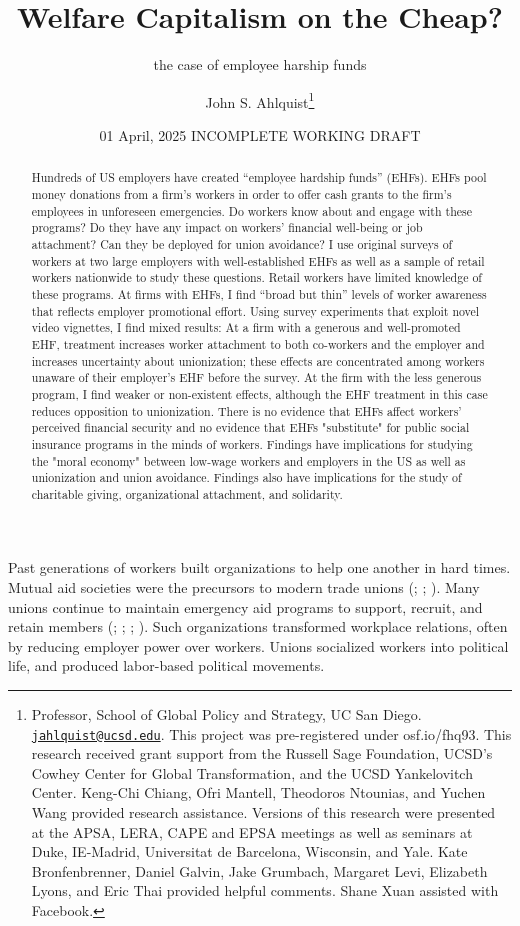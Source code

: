 \documentclass[
  11pt,
  oneside]{article}
\title{Welfare Capitalism on the Cheap?}
\subtitle{the case of employee harship funds}
\author{John S. Ahlquist\footnote{Professor, School of Global Policy and Strategy, UC San Diego. \href{mailto:jahlquist@ucsd.edu}{\nolinkurl{jahlquist@ucsd.edu}}. This project was pre-registered under osf.io/fhq93. This research received grant support from the Russell Sage Foundation, UCSD's Cowhey Center for Global Transformation, and the UCSD Yankelovitch Center. Keng-Chi Chiang, Ofri Mantell, Theodoros Ntounias, and Yuchen Wang provided research assistance. Versions of this research were presented at the APSA, LERA, CAPE and EPSA meetings as well as seminars at Duke, IE-Madrid, Universitat de Barcelona, Wisconsin, and Yale. Kate Bronfenbrenner, Daniel Galvin, Jake Grumbach, Margaret Levi, Elizabeth Lyons, and Eric Thai provided helpful comments. Shane Xuan assisted with Facebook.}}
\date{01 April, 2025 INCOMPLETE WORKING DRAFT}
\begin{document}
\maketitle

\begin{abstract}
\begin{singlespace} 
Hundreds of US employers have created “employee hardship funds” (EHFs). EHFs pool money donations from a firm’s workers in order to offer cash grants to the firm’s employees in unforeseen emergencies. Do workers know about and engage with these programs? Do they have any impact on workers’ financial well-being or job attachment? Can they be deployed for union avoidance? I use original surveys of workers at two large employers with well-established EHFs as well as a sample of retail workers nationwide to study these questions. Retail workers have limited knowledge of these programs.  At firms with EHFs, I find “broad but thin” levels of worker awareness that reflects employer promotional effort. Using survey experiments that exploit novel video vignettes, I find mixed results: At a firm with a generous and well-promoted EHF, treatment increases worker attachment to both co-workers and the employer and increases uncertainty about unionization; these effects are concentrated among workers unaware of their employer’s EHF before the survey.  At the firm with the less generous program, I find weaker or non-existent effects, although the EHF treatment in this case reduces opposition to unionization. There is no evidence that EHFs affect workers’ perceived financial security and no evidence that EHFs "substitute" for public social insurance programs in the minds of workers.  Findings have implications for studying the "moral economy" between low-wage workers and employers in the US as well as unionization and union avoidance.  Findings also have implications for the study of charitable giving, organizational attachment, and solidarity.
\end{singlespace}
\end{abstract}

Past generations of workers built organizations to help one another in hard times. Mutual aid societies were the precursors to modern trade unions (; ; ). Many unions continue to maintain emergency aid programs to support, recruit, and retain members (; ; ; ). Such organizations transformed workplace relations, often by reducing employer power over workers. Unions socialized workers into political life, and produced labor-based political movements.
\end{document}
